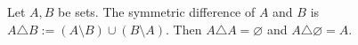 Let $A, B$ be sets.
The symmetric difference of $A$ and $B$ is $A \triangle B := (A \setminus B) \cup (B \setminus A)$.
Then $A \triangle A = \varnothing$ and $A \triangle \varnothing = A$.